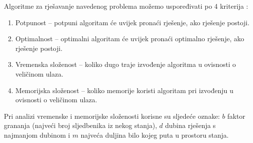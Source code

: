 Algoritme za rješavanje navedenog problema možemo uspoređivati po 4 kriterija \cite{russelNorvig2003:aima}:

\begin{enumerate}
	\item Potpunost -- potpuni algoritam će uvijek pronaći rješenje, ako rješenje postoji.
	\item Optimalnost -- optimalni algoritam će uvijek pronaći optimalno rješenje, ako rješenje postoji.
	\item Vremenska složenost -- koliko dugo traje izvođenje algoritma u ovisnosti o veličinom ulaza.
	\item Memorijska složenost -- koliko memorije koristi algoritam pri izvođenju u ovisnosti o veličinom ulaza.
\end{enumerate}

Pri analizi vremenske i memorijske složenosti korisne su sljedeće oznake: \( b \) faktor grananja (najveći broj sljedbenika iz nekog stanja), \( d \) dubina rješenja s najmanjom dubinom i \( m \) najveća duljina bilo kojeg puta u prostoru stanja.